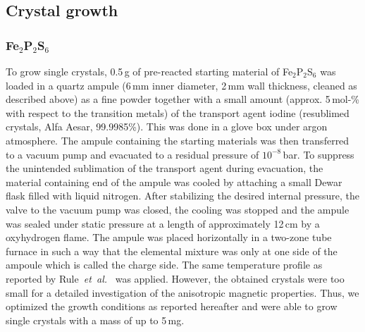 \documentclass[twocolumn,superscriptaddress,prb,preprintnumbers,nobibnotes,aps]{revtex4-2}  %
\begin{document}
\subsection{Crystal growth}

\subsubsection{Fe$_2$P$_2$S$_6$}

To grow single crystals, 0.5\,g of pre-reacted starting material of Fe$_2$P$_2$S$_6$ was loaded in a quartz ampule (6\,mm inner diameter, 2\,mm wall thickness, cleaned as described above) as a fine powder together with a small amount (approx. 5\,mol-\% with respect to the transition metals) of the transport agent iodine (resublimed crystals, Alfa Aesar, 99.9985\%). This was done in a glove box under argon atmosphere. The ampule containing the starting materials was then transferred to a vacuum pump and evacuated to a residual pressure of $10^{-8}$\,bar. To suppress the unintended sublimation of the transport agent during evacuation, the material containing end of the ampule was cooled by attaching a small Dewar flask filled with liquid nitrogen. After stabilizing the desired internal pressure, the valve to the vacuum pump was closed, the cooling was stopped and the ampule was sealed under static pressure at a length of approximately 12\,cm by a oxyhydrogen flame. The ampule was placed horizontally in a two-zone tube furnace in such a way that the elemental mixture was only at one side of the ampoule which is called the charge side. The same temperature profile as reported by Rule~\textit{et~al.}~\cite{Rule2002} was applied. However, the obtained crystals were too small for a detailed investigation of the anisotropic magnetic properties. Thus, we optimized the growth conditions as reported hereafter and were able to grow single crystals with a mass of up to 5\,mg.
\end{document}
